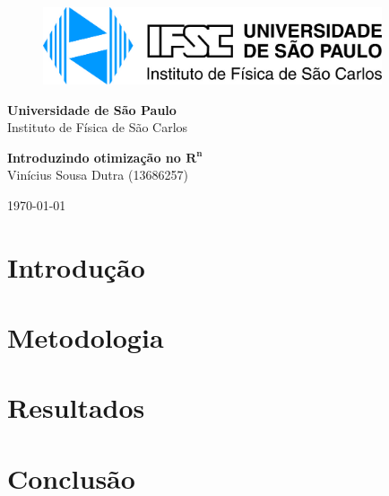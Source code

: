 \documentclass{article}
\newcommand{\theauthor}{Vinícius Sousa Dutra (13686257)}
\newcommand{\thetitle}{Introduzindo otimização no $\mathbf{R^n}$}
\begin{document}
\begin{titlepage}
    \begin{center}
        \begin{figure}[htb!]
            \centering
            \includegraphics[width=100mm]{images/ifsc_logo.jpg}
        \end{figure}
        \vspace{20pt}
        \Large{\textbf{Universidade de São Paulo}}\\
        \Large{Instituto de Física de São Carlos}\\

        \vspace{150pt}

        \LARGE{\textbf{{\thetitle}}} 
        \\
        \Large {\theauthor\\} 


        \vspace{125pt}
        \vspace{\fill}  
        \Large {\today}

    \end{center}
\end{titlepage}

\newpage
\tableofcontents
\listoffigures
\listoftables
\listoflistings

\newpage


\section{Introdução}
\blindtext
\cite{fishback2007taylor}
\section{Metodologia}
\blindtext
\section{Resultados}
\blindtext[2]
\section{Conclusão}
\blindtext


\end{document}
